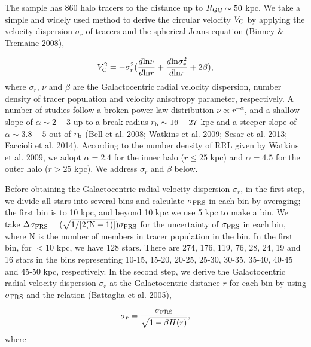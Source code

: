 \documentclass[12pt,preprint]{aastex}
\begin{document}
The sample has 860 halo tracers to the distance up to $R_{\rm GC}
\sim 50$ kpc. We take a simple and widely used method to derive the
circular velocity $V_{\rm C}$ by applying the velocity dispersion
$\sigma_r$ of tracers and the spherical Jeans equation (Binney \&
Tremaine 2008),

\begin{equation}
V^2_{\rm C} = -{\sigma}^2_r(\frac{d{\rm ln}\nu}{d{\rm ln}r} + \frac{d{\rm ln}{\sigma}^2_r}{d{\rm ln}r} + 2\beta),
\end{equation}
where $\sigma_r$, $\nu$ and $\beta$ are the Galactocentric radial
velocity dispersion, number density of tracer population and
velocity anisotropy parameter, respectively. A number of studies
follow a broken power-law distribution $\nu \propto r^{-\alpha}$,
and a shallow slope of $\alpha \sim 2-3$ up to a break radius
$r_{\rm b} \sim 16-27$ kpc and a steeper slope of $\alpha \sim
3.8-5$ out of $r_{\rm b}$ (Bell et al. 2008; Watkins et al. 2009;
Sesar et al. 2013; Faccioli et al. 2014). According to the number
density of RRL given by Watkins et al. 2009, we adopt $\alpha = 2.4$
for the inner halo ($r \leq 25$ kpc) and $\alpha = 4.5$ for the
outer halo ($r > 25$ kpc). We address $\sigma_r$ and $\beta$ below.


Before obtaining the Galactocentric radial velocity dispersion
$\sigma_r$, in the first step, we divide all stars into several bins
and calculate $\sigma_{\rm FRS}$ in each bin by averaging; the first
bin is to 10 kpc, and beyond 10 kpc we use 5 kpc to make a bin. We
take $\Delta\sigma_{\rm FRS} = (\sqrt{1/[2({\rm N} -
1)]})\sigma_{\rm FRS}$ for the uncertainty of $\sigma_{\rm FRS}$ in
each bin, where N is the number of members in tracer population in the bin. In the
first bin, for $<10$ kpc, we have 128 stars. There are 274, 176, 119, 76,
28, 24, 19 and 16 stars in the bins representing 10-15, 15-20, 20-25,
25-30, 30-35, 35-40, 40-45 and 45-50 kpc, respectively.  In the second
step, we derive the Galactocentric radial velocity dispersion
$\sigma_r$ at the Galactocentric distance $r$ for each bin by using
$\sigma_{\rm FRS}$ and the relation (Battaglia et al. 2005),

\begin{equation}
\sigma_{r} = \frac{\sigma_{\rm FRS}}{\sqrt{1 - \beta H(r)}},
\end{equation}
where
\end{document}
